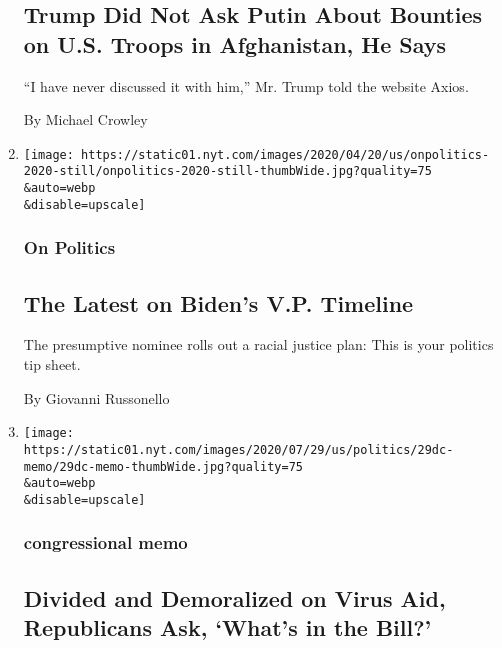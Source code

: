 \begin{enumerate}
  \hypertarget{trump-did-not-ask-putin-about-bounties-on-us-troops-in-afghanistan-he-says}{%
  \subsection{Trump Did Not Ask Putin About Bounties on U.S. Troops in
  Afghanistan, He
  Says}\label{trump-did-not-ask-putin-about-bounties-on-us-troops-in-afghanistan-he-says}}

  ``I have never discussed it with him,'' Mr. Trump told the website
  Axios.

  By Michael Crowley
\item
  \href{/2020/07/29/us/politics/biden-vp-announcement.html}{}

  \texttt{[image: https://static01.nyt.com/images/2020/04/20/us/onpolitics-2020-still/onpolitics-2020-still-thumbWide.jpg?quality=75\\\&auto=webp\\\&disable=upscale]}

  \hypertarget{on-politics}{%
  \subsubsection{On Politics}\label{on-politics}}

  \hypertarget{the-latest-on-bidens-vp-timeline}{%
  \subsection{The Latest on Biden's V.P.
  Timeline}\label{the-latest-on-bidens-vp-timeline}}

  The presumptive nominee rolls out a racial justice plan: This is your
  politics tip sheet.

  By Giovanni Russonello
\item
  \href{/2020/07/29/us/politics/republicans-congress-virus-aid.html}{}

  \texttt{[image: https://static01.nyt.com/images/2020/07/29/us/politics/29dc-memo/29dc-memo-thumbWide.jpg?quality=75\\\&auto=webp\\\&disable=upscale]}

  \hypertarget{congressional-memo}{%
  \subsubsection{congressional memo}\label{congressional-memo}}

  \hypertarget{divided-and-demoralized-on-virus-aid-republicans-ask-whats-in-the-bill}{%
  \subsection{Divided and Demoralized on Virus Aid, Republicans Ask,
  `What's in the
  Bill?'}\label{divided-and-demoralized-on-virus-aid-republicans-ask-whats-in-the-bill}}


\end{enumerate}
